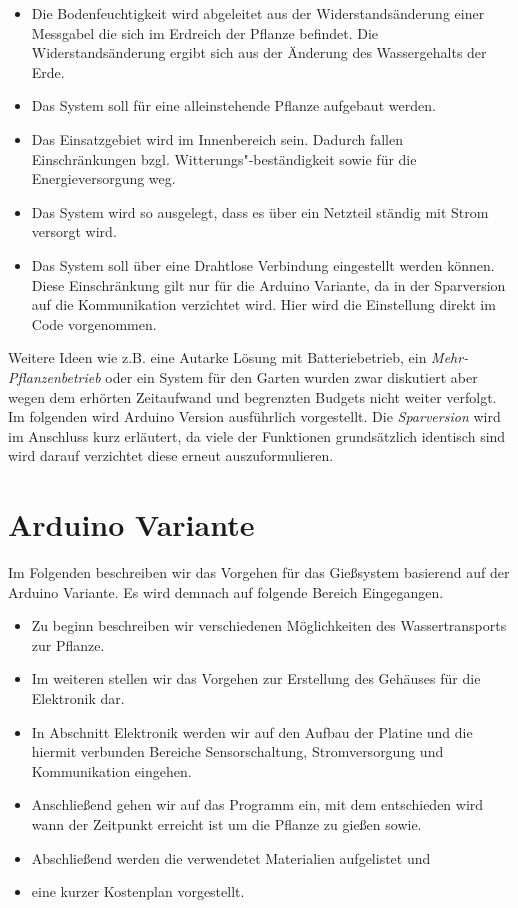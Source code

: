 \documentclass[]{IEEEtran}
\begin{document}
\begin{itemize}
	\item Die Bodenfeuchtigkeit wird abgeleitet aus der Widerstandsänderung einer Messgabel die sich im Erdreich der Pflanze befindet. Die Widerstandsänderung ergibt sich aus der Änderung des Wassergehalts der Erde.
	\item Das System soll für eine alleinstehende Pflanze aufgebaut werden. 
	\item Das Einsatzgebiet wird im Innenbereich sein. Dadurch fallen Einschränkungen bzgl. Witterungs"-beständigkeit sowie für die Energieversorgung weg.
	\item Das System wird so ausgelegt, dass es über ein Netzteil ständig mit Strom versorgt wird.
	\item Das System soll über eine Drahtlose Verbindung eingestellt werden können. Diese Einschränkung gilt nur für die Arduino Variante, da in der Sparversion auf die Kommunikation verzichtet wird. Hier wird die Einstellung direkt im Code vorgenommen.

\end{itemize}

Weitere Ideen wie z.B. eine Autarke Lösung mit Batteriebetrieb, ein \emph{Mehr-Pflanzenbetrieb} oder ein System für den Garten wurden zwar diskutiert aber wegen dem erhörten Zeitaufwand und begrenzten Budgets nicht weiter verfolgt. 
Im folgenden wird Arduino Version ausführlich vorgestellt. 
Die \emph{Sparversion} wird im Anschluss kurz erläutert, da viele der Funktionen grundsätzlich identisch sind wird darauf verzichtet diese erneut auszuformulieren. 

\section{Arduino Variante}
Im Folgenden beschreiben wir das Vorgehen für das Gießsystem basierend auf der Arduino Variante. 
Es wird demnach auf folgende Bereich Eingegangen.  

\begin{itemize}
	\item Zu beginn beschreiben wir verschiedenen Möglichkeiten des Wassertransports zur Pflanze.
	\item Im weiteren stellen wir das Vorgehen zur Erstellung des Gehäuses für die Elektronik dar.
	\item In Abschnitt Elektronik werden wir auf den Aufbau der Platine und die hiermit verbunden Bereiche Sensorschaltung, Stromversorgung und Kommunikation eingehen.
	\item Anschließend gehen wir auf das Programm ein, mit dem entschieden wird wann der Zeitpunkt erreicht ist um die Pflanze zu gießen sowie.
	\item Abschließend werden die verwendetet Materialien aufgelistet und
	\item eine kurzer Kostenplan vorgestellt. 
	
\end{itemize}
\end{document}
